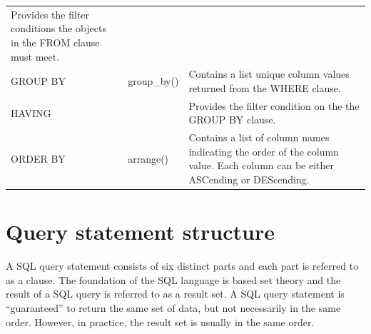 \documentclass[]{book}
\theoremstyle{definition}
\theoremstyle{definition}
\theoremstyle{definition}
\theoremstyle{remark}
\begin{document}
\begin{longtable}[]{@{}lll@{}}
\begin{minipage}[t]{0.42\columnwidth}
Provides the filter conditions the objects in the FROM clause must
meet.\strut
\end{minipage}\tabularnewline
\begin{minipage}[t]{0.24\columnwidth}\raggedright
GROUP BY\strut
\end{minipage} & \begin{minipage}[t]{0.24\columnwidth}\raggedright
group\_by()\strut
\end{minipage} & \begin{minipage}[t]{0.42\columnwidth}\raggedright
Contains a list unique column values returned from the WHERE
clause.\strut
\end{minipage}\tabularnewline
\begin{minipage}[t]{0.24\columnwidth}\raggedright
HAVING\strut
\end{minipage} & \begin{minipage}[t]{0.24\columnwidth}\raggedright
\strut
\end{minipage} & \begin{minipage}[t]{0.42\columnwidth}\raggedright
Provides the filter condition on the the GROUP BY clause.\strut
\end{minipage}\tabularnewline
\begin{minipage}[t]{0.24\columnwidth}\raggedright
ORDER BY\strut
\end{minipage} & \begin{minipage}[t]{0.24\columnwidth}\raggedright
arrange()\strut
\end{minipage} & \begin{minipage}[t]{0.42\columnwidth}\raggedright
Contains a list of column names indicating the order of the column
value. Each column can be either ASCending or DEScending.\strut
\end{minipage}\tabularnewline
\bottomrule
\end{longtable}

\hypertarget{query-statement-structure}{%
\section{Query statement structure}\label{query-statement-structure}}

A SQL query statement consists of six distinct parts and each part is
referred to as a clause. The foundation of the SQL language is based set
theory and the result of a SQL query is referred to as a result set. A
SQL query statement is ``guaranteed'' to return the same set of data,
but not necessarily in the same order. However, in practice, the result
set is usually in the same order.
\end{document}
